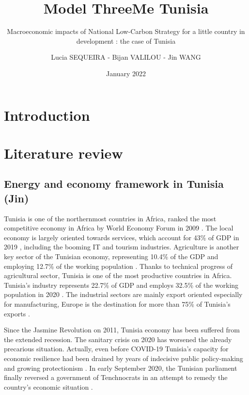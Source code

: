 \documentclass[
]{article}
\title{Model ThreeMe Tunisia}
\subtitle{Macroeconomic impacts of National Low-Carbon Strategy for a
little country in development : the case of Tunisia}
\author{Lucia SEQUEIRA - Bijan VALILOU - Jin WANG}
\date{January 2022}
\begin{document}
\maketitle

{
\setcounter{tocdepth}{2}
\tableofcontents
}
\newpage

\hypertarget{introduction}{%
\section{Introduction}\label{introduction}}

\hypertarget{literature-review}{%
\section{Literature review}\label{literature-review}}

\hypertarget{energy-and-economy-framework-in-tunisia-jin}{%
\subsection{Energy and economy framework in Tunisia
(Jin)}\label{energy-and-economy-framework-in-tunisia-jin}}

Tunisia is one of the northernmost countries in Africa, ranked the most
competitive economy in Africa by World Economy Forum in 2009
\autocite{tunisia2022}. The local economy is largely oriented towards
services, which account for 43\% of GDP in 2019
\autocite{worldbank2020}, including the booming IT and tourism
industries. Agriculture is another key sector of the Tunisian economy,
representing 10.4\% of the GDP and employing 12.7\% of the working
population \autocite{worldbank2020}. Thanks to technical progress of
agricultural sector, Tunisia is one of the most productive countries in
Africa. Tunisia's industry represents 22.7\% of GDP and employs 32.5\%
of the working population in 2020 \autocite{bnpparibas}. The industrial
sectors are mainly export oriented especially for manufacturing, Europe
is the destination for more than 75\% of Tunisia's exports
\autocite{worldbank2020}.

Since the Jasmine Revolution on 2011, Tunisia economy has been suffered
from the extended recession. The sanitary crisis on 2020 has worsened
the already precarious situation. Actually, even before COVID-19
Tunisia's capacity for economic resilience had been drained by years of
indecisive public policy-making and growing protectionism
\autocite{worldbank}. In early September 2020, the Tunisian parliament
finally reversed a government of Tenchnocrats in an attempt to remedy
the country's economic situation \autocite{bnpparibas}.
\end{document}
